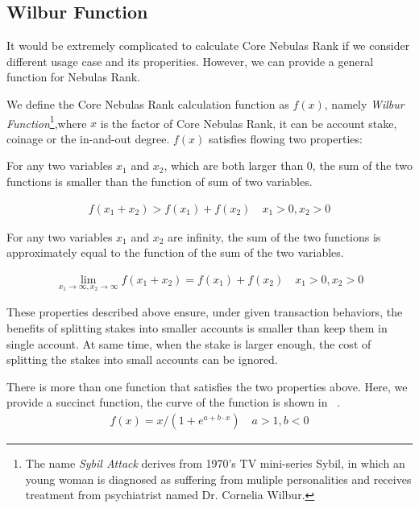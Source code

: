 \subsection{Wilbur Function \label{sec:function}}
It would be extremely complicated to calculate Core Nebulas Rank if we consider different usage case and its properities. However, we can provide a general function for Nebulas Rank.

We define the Core Nebulas Rank calculation function as \(f(x)\), namely \emph{Wilbur Function}\footnote{The name \emph{Sybil Attack} derives from 1970's TV mini-series Sybil, in which an young woman is diagnosed as suffering from muliple personalities and receives treatment from psychiatrist named Dr. Cornelia Wilbur.},where \(x\) is the factor of Core Nebulas Rank, it can be account stake, coinage or the in-and-out degree. $f(x)$ satisfies flowing two properties:

\begin{property}
\label{prop:one}
For any two variables $x_1$ and $x_2$, which are both larger than $0$, the sum of the two functions is smaller than the function of sum of two variables.
\end{property}

\begin{align}
f(x_1+x_2)>f(x_1)+f(x_2) \quad x_1>0,x_2>0
\end{align}

\begin{property}
\label{prop:two}
For any two variables $x_1$ and $x_2$ are infinity, the sum of the two functions is approximately equal to the function of the sum of the two variables.
\end{property}

\begin{align}
\lim\limits_{x_1 \to \infty, x_2\to \infty} f(x_1+x_2) = f(x_1) + f(x_2)\quad x_1>0, x_2>0
\end{align}

These properties described above ensure, under given transaction behaviors, the benefits of splitting stakes into smaller accounts is smaller than keep them in single account. At same time, when the stake is larger enough, the cost of splitting the stakes into small accounts can be ignored. 

There is more than one function that satisfies the two properties above. Here, we provide a succinct function, the curve of the function is shown in ~.
\begin{align}
f(x) = x/(1 + e^{a + b\cdot x}) \quad a>1,b<0
\end{align}

